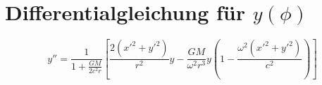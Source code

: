 \section{Differentialgleichung für \(y(\phi)\)}
\[ y'' = \frac{1}{1 + \frac{GM}{2c^2r}} \left[ \frac{2(x'^2 + y'^2)}{r^2}y - \frac{GM}{\omega^2 r^3}y\left(1 - \frac{\omega^2(x'^2 + y'^2)}{c^2}\right) \right] \]